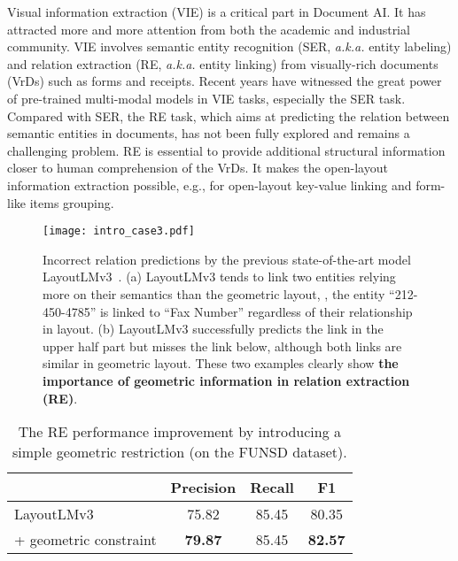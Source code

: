 \documentclass[10pt,twocolumn,letterpaper]{article}
\begin{document}
Visual information extraction (VIE) is a critical part in Document AI\cite{cui2021document, Zhu2016SceneTD, Long2018SceneTD}. It has attracted more and more attention from both the academic and industrial community.
VIE involves semantic entity recognition (SER, \textit{a.k.a.} entity labeling) and relation extraction (RE, \textit{a.k.a.} entity linking) from visually-rich documents (VrDs) such as forms and receipts\cite{jaume2019funsd,zhang2021entity,cui2021document,li2021structext,xu2021layoutxlm, Shi2015AnET, Zhou2017EASTAE, wang2022multi}.
Recent years have witnessed the great power of pre-trained multi-modal models \cite{xu2020layoutlm,xu2021layoutxlm,xu2020layoutlmv2,huang2022layoutlmv3,li2021structurallm,li2021structext,li2021selfdoc,appalaraju2021docformer,gu2022unified,wang2022lilt,gu2022xylayoutlm,luo2022bivldoc,hong2022bros} in VIE tasks, especially the SER task.
Compared with SER, the RE task, which aims at predicting the relation between semantic entities in documents, has not been fully explored and remains a challenging problem\cite{li2021structext,hong2022bros}. RE is essential to provide additional structural information closer to human comprehension of the VrDs\cite{zhang2021entity}. It makes the open-layout information extraction possible, e.g., for open-layout key-value linking and form-like items grouping.

\begin{figure}[tp]
  \texttt{[image: intro\_case3.pdf]}
  \caption{Incorrect relation predictions by the previous state-of-the-art model LayoutLMv3~\cite{huang2022layoutlmv3}. (a) LayoutLMv3 tends to link two entities relying more on their semantics than the geometric layout, \ie, the entity ``212-450-4785'' is linked to ``Fax Number'' regardless of their relationship in layout. (b) LayoutLMv3 successfully predicts the link in the upper half part but misses the link below, although both links are similar in geometric layout. These two examples clearly show \textbf{the importance of geometric information in relation extraction (RE)}.}
  \label{intro_case}
  \vspace{-2mm}
\end{figure}

\begin{table}[tp]
  \centering
  \begin{tabular}{lccc}
    \toprule[1pt]
    & \textbf{Precision} & \textbf{Recall} & \textbf{F1} \\
    \hline
    LayoutLMv3 & 75.82 & 85.45 & 80.35 \\
    + geometric constraint & \textbf{79.87} & 85.45 & \textbf{82.57} \\
    \bottomrule[1pt]
  \end{tabular}
\caption{The RE performance improvement by introducing a simple geometric restriction (on the FUNSD dataset).}
  \vspace{-3mm}
  \label{intro_v3_geo}
\end{table}
\end{document}
